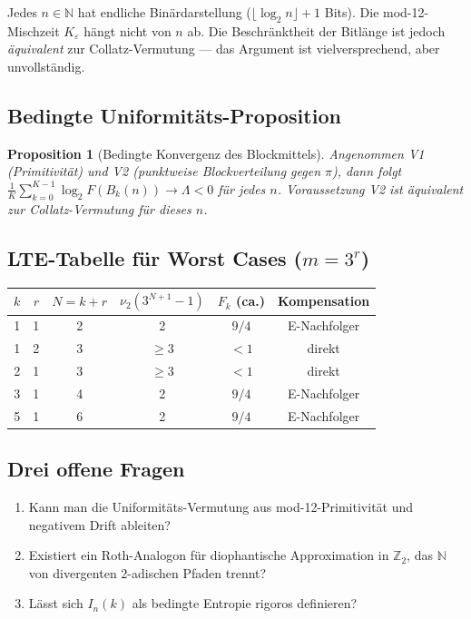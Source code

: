 \documentclass[12pt,a4paper]{article}
\newtheorem{proposition}[satz]{Proposition}
\newcommand{\vii}{\nu_2}
\newcommand{\N}{\mathbb{N}}
\newcommand{\Ztwo}{\mathbb{Z}_2}
\newcommand{\Lam}{\Lambda}
\begin{document}
\begin{tcolorbox}[offen,title={Schritt C: Binärinformation (bedingt)}]
Jedes $n \in \N$ hat endliche Binärdarstellung ($\lfloor\log_2 n\rfloor+1$
Bits). Die mod-12-Mischzeit $K_\varepsilon$ hängt nicht von $n$ ab.
Die Beschränktheit der Bitlänge ist jedoch \emph{äquivalent} zur
Collatz-Vermutung --- das Argument ist vielversprechend, aber unvollständig.
\end{tcolorbox}

\subsection{Bedingte Uniformitäts-Proposition}

\begin{proposition}[Bedingte Konvergenz des Blockmittels]
Angenommen V1 (Primitivität) und V2 (punktweise Blockverteilung gegen $\pi$),
dann folgt $\frac{1}{K}\sum_{k=0}^{K-1}\log_2 F(B_k(n))\to\Lam<0$ für jedes
$n$. Voraussetzung V2 ist äquivalent zur Collatz-Vermutung für dieses $n$.
\end{proposition}

\subsection{LTE-Tabelle für Worst Cases ($m=3^r$)}

\begin{center}
\small
\begin{tabular}{cccccc}
\toprule
$k$ & $r$ & $N=k+r$ & $\vii(3^{N+1}-1)$ & $F_k$ (ca.) & Kompensation \\
\midrule
1 & 1 & 2 & 2 & $9/4$ & E-Nachfolger \\
1 & 2 & 3 & $\geq 3$ & $<1$ & direkt \\
2 & 1 & 3 & $\geq 3$ & $<1$ & direkt \\
3 & 1 & 4 & 2 & $9/4$ & E-Nachfolger \\
5 & 1 & 6 & 2 & $9/4$ & E-Nachfolger \\
\bottomrule
\end{tabular}
\end{center}

\subsection{Drei offene Fragen}

\begin{enumerate}
  \item Kann man die Uniformitäts-Vermutung aus mod-12-Primitivität
    und negativem Drift ableiten?
  \item Existiert ein Roth-Analogon für diophantische Approximation
    in $\Ztwo$, das $\N$ von divergenten 2-adischen Pfaden trennt?
  \item Lässt sich $I_n(k)$ als bedingte Entropie rigoros definieren?
\end{enumerate}
\end{document}
